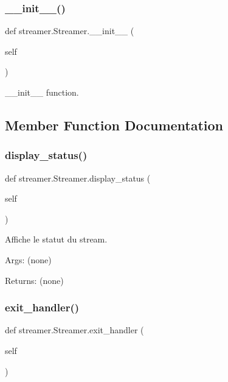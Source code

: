 \subsubsection{\texorpdfstring{\+\_\+\+\_\+init\+\_\+\+\_\+()}{\_\_init\_\_()}}
{\footnotesize\ttfamily def streamer.\+Streamer.\+\_\+\+\_\+init\+\_\+\+\_\+ (\begin{DoxyParamCaption}\item[{}]{self }\end{DoxyParamCaption})}

\begin{DoxyVerb}__init__ function.
\end{DoxyVerb}
 

\subsection{Member Function Documentation}
\mbox{\label{classstreamer_1_1_streamer_a2b946c06d88923c6e742c7cfeb50331b}} 
\subsubsection{\texorpdfstring{display\+\_\+status()}{display\_status()}}
{\footnotesize\ttfamily def streamer.\+Streamer.\+display\+\_\+status (\begin{DoxyParamCaption}\item[{}]{self }\end{DoxyParamCaption})}

\begin{DoxyVerb}Affiche le statut du stream.

Args:
    (none)

Returns:
    (none)
\end{DoxyVerb}
 \mbox{\label{classstreamer_1_1_streamer_a23ddd6eaeab682bd4267c13b0d6ff45a}} 
\subsubsection{\texorpdfstring{exit\+\_\+handler()}{exit\_handler()}}
{\footnotesize\ttfamily def streamer.\+Streamer.\+exit\+\_\+handler (\begin{DoxyParamCaption}\item[{}]{self }\end{DoxyParamCaption})}

